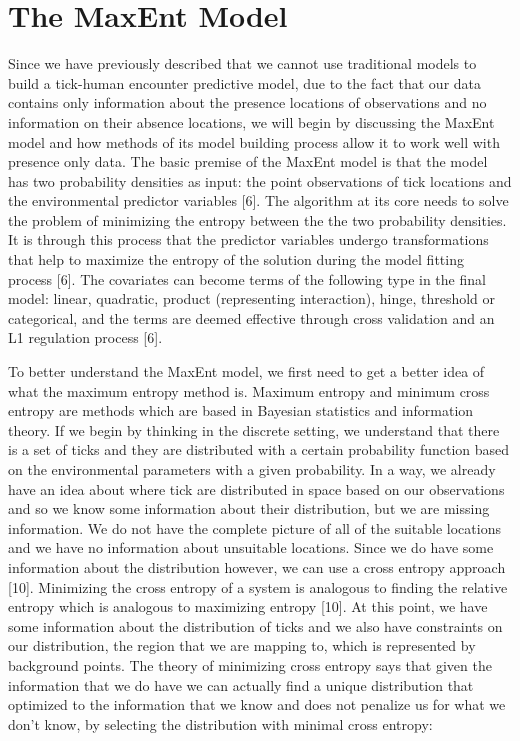 \section{The MaxEnt Model}
Since we have previously described that we cannot use traditional models to build a tick-human encounter predictive model, due to the fact that our data contains only information about the presence locations of observations and no information on their absence locations, we will begin by discussing the MaxEnt model and how methods of its model building process allow it to work well with presence only data. The basic premise of the MaxEnt model is that the model has two probability densities as input: the point observations of tick locations and the environmental predictor variables [6]. The algorithm at its core needs to solve the problem of minimizing the entropy between the the two probability densities. It is through this process that the predictor variables undergo transformations that help to maximize the entropy of the solution during the model fitting process [6]. The covariates can become terms of the following type in the final model: linear, quadratic, product (representing interaction), hinge, threshold or categorical, and the terms are deemed effective through cross validation and an L1 regulation process [6].  \newline

\noindent To better understand the MaxEnt model, we first need to get a better idea of what the maximum entropy method is. Maximum entropy and minimum cross entropy are methods which are based in Bayesian statistics and information theory. If we begin by thinking in the discrete setting, we understand that there is a set of ticks and they are distributed with a certain probability function based on the environmental parameters with a given probability. In a way, we already have an idea about where tick are distributed in space based on our observations and so we know some information about their distribution, but we are missing information. We do not have the complete picture of all of the suitable locations and we have no information about unsuitable locations. Since we do have some information about the distribution however, we can use a cross entropy approach [10]. Minimizing the cross entropy of a system is analogous to finding the relative entropy which is analogous to maximizing entropy [10].   At this point, we have some information about the distribution of ticks and we also have constraints on our distribution, the region that we are mapping to, which is represented by background points. The theory of minimizing cross entropy says that given the information that we do have we can actually find a unique distribution that optimized to the information that we know and does not penalize us for what we don't know, by selecting the distribution with minimal cross entropy:  \newline


